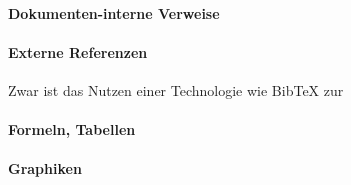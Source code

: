 %
%
%
%
\paragraph*{Dokumenten-interne Verweise}%

\paragraph*{Externe Referenzen}%
%
% 
%
Zwar ist das Nutzen einer Technologie wie BibTeX zur 


%
%
% 
%
\paragraph*{Formeln, Tabellen}



\paragraph*{Graphiken}%







